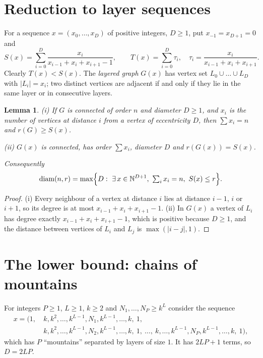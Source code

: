 \documentclass[11pt]{amsart}
\newtheorem{lemma}[theorem]{Lemma}
\theoremstyle{definition}
\theoremstyle{remark}
\newcommand{\diam}{\operatorname{diam}}
\newcommand{\N}{\mathbb{N}}
\begin{document}
\section{Reduction to layer sequences}

For a sequence $x=(x_0,\dots,x_D)$ of positive integers, $D\ge1$, put $x_{-1}=x_{D+1}=0$ and
\[
S(x)=\sum_{i=0}^{D}\frac{x_i}{x_{i-1}+x_i+x_{i+1}-1},\qquad
T(x)=\sum_{i=0}^{D}\tau_i,\quad \tau_i=\frac{x_i}{x_{i-1}+x_i+x_{i+1}} .
\]
Clearly $T(x)<S(x)$.
The \emph{layered graph} $G(x)$ has vertex set $L_0\cup\dots\cup L_D$ with $|L_i|=x_i$; two distinct vertices are adjacent if and only if they lie in the same layer or in consecutive layers.

\begin{lemma}\label{lem:reduction}
{\rm(i)} If $G$ is connected of order $n$ and diameter $D\ge1$, and $x_i$ is the number of vertices at distance $i$ from a vertex of eccentricity $D$, then $\sum x_i=n$ and $r(G)\ge S(x)$.

{\rm(ii)} $G(x)$ is connected, has order $\sum x_i$, diameter $D$ and $r(G(x))=S(x)$.

Consequently
\[
\diam(n,r)=\max\Bigl\{D:\ \exists\,x\in\N^{D+1},\ \textstyle\sum_i x_i=n,\ S(x)\le r\Bigr\}.
\]
\end{lemma}

\begin{proof}
(i) Every neighbour of a vertex at distance $i$ lies at distance $i-1$, $i$ or $i+1$, so its degree is at most $x_{i-1}+x_i+x_{i+1}-1$.
(ii) In $G(x)$ a vertex of $L_i$ has degree exactly $x_{i-1}+x_i+x_{i+1}-1$, which is positive because $D\ge1$, and the distance between vertices of $L_i$ and $L_j$ is $\max(|i-j|,1)$.
\end{proof}

\section{The lower bound: chains of mountains}

For integers $P\ge1$, $L\ge1$, $k\ge2$ and $N_1,\dots,N_P\ge k^L$ consider the sequence
\begin{align*}
x=\bigl(1,\ &k,k^2,\dots,k^{L-1},N_1,k^{L-1},\dots,k,\ 1,\\
&k,k^2,\dots,k^{L-1},N_2,k^{L-1},\dots,k,\ 1,\ \dots,\ k,\dots,k^{L-1},N_P,k^{L-1},\dots,k,\ 1\bigr),
\end{align*}
which has $P$ ``mountains'' separated by layers of size $1$. It has $2LP+1$ terms, so $D=2LP$.
\end{document}
